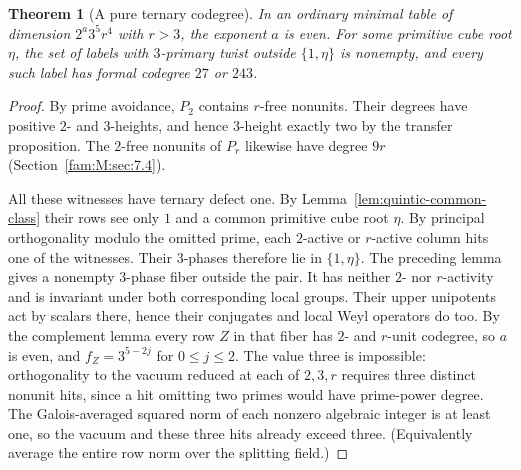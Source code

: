 \documentclass[11pt,a4paper]{article}
\numberwithin{equation}{section}
\newtheorem{theorem}{Theorem}[section]
\theoremstyle{remark}
\begin{document}
\begin{theorem}[A pure ternary codegree]\label{fam:Q:6.4}\label{fam:Q:n:quart:pure}
In an ordinary minimal table of dimension $2^a3^5r^4$ with $r>3$,
the exponent $a$ is even. For some primitive cube root $\eta$,
the set of labels with $3$-primary twist outside $\{1,\eta\}$
is nonempty, and every such label has formal codegree $27$ or $243$.
\end{theorem}
\begin{proof}
By prime avoidance, $P_2$ contains $r$-free nonunits. Their
degrees have positive $2$- and $3$-heights, and hence $3$-height
exactly two by the transfer proposition. The $2$-free nonunits of
$P_r$ likewise have degree $9r$ (Section~\ref{fam:M:sec:7.4}).

All these witnesses have ternary defect one. By
Lemma~\ref{lem:quintic-common-class} their rows see only $1$ and
a common primitive cube root $\eta$. By principal orthogonality
modulo the omitted prime, each $2$-active or $r$-active column
hits one of the witnesses. Their $3$-phases therefore lie in
$\{1,\eta\}$. The preceding lemma gives a nonempty $3$-phase
fiber outside the pair. It has neither $2$- nor $r$-activity and
is invariant under both corresponding local groups. Their upper
unipotents act by scalars there, hence their conjugates and local
Weyl operators do too. By the complement lemma every row $Z$ in
that fiber has $2$- and $r$-unit codegree, so $a$ is even, and
$f_Z=3^{5-2j}$ for $0\le j\le2$. The value three is impossible:
orthogonality to the vacuum reduced at each of $2,3,r$ requires
three distinct nonunit hits, since a hit omitting two primes
would have prime-power degree. The Galois-averaged squared norm
of each nonzero algebraic integer is at least one, so the vacuum
and these three hits already exceed three. (Equivalently average
the entire row norm over the splitting field.)
\end{proof}
\end{document}
